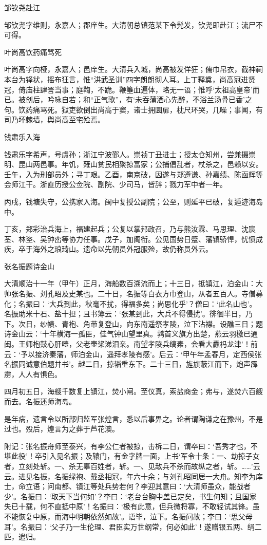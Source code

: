 \documentclass[]{article}
\begin{document}
邹钦尧赴江

邹钦尧字维则，永嘉人；郡庠生。大清朝总镇范某下令髡发，钦尧即赴江；流尸不可得。

叶尚高饮药痛骂死

叶尚高字向桠，永嘉人；邑庠生。大清兵入城，尚高被发佯狂；儒巾帛衣，截神祠本台为铎状，摇布狂言，惟``洪武圣训''四字朗朗彻人耳。上丁释奠，尚高冠进贤冠，倚庙柱肆詈当事；庭鞫，不跪。鞭箠血遍体，略无一语；惟呼`太祖高皇帝'而已。被创后，吟咏自若；和``正气歌''，有`未吞蒲酒心先醉，不浴兰汤骨已香'之句。饮药痛骂死。狱吏欲倒出尚高于窦，诸士拥圜扉，枕尺环哭，几噪；事闻，有司乃坏棘墙，舆尚高至宅殓焉。

钱肃乐入海

钱肃乐字希声，号虞孙；浙江宁波鄞人。崇祯丁丑进士；授太仓知州，尝兼摄崇明、昆山两邑事。年饥，薙山贫民相聚掠富家；公捕倡乱者，杖杀之，邑赖以安。壬午，入为刑部员外；寻丁艰。乙酉，南京破，因遂与郑遵谦、孙嘉绩、陈函辉等会师江干。浙直历授公佥院、副院、少司马，皆辞；戮力军中者一年。

丙戌，钱塘失守，公携家入海。闽中复授公副院；公至，则延平已破，复遁迹海岛中。

丁亥，郑彩治兵海上，福建起兵；公复以掌邦政召，乃与熊汝霖、马思理、沈宸荃、林垐、吴钟峦等协力任事。戊子，加阁衔。公见国势日蹙、藩镇骄悍，忧愤成疾，卒于海外之琅琦山。遗命以先朝员外冠服殓，故仍称员外云。

张名振题诗金山

大清顺治十一年（甲午）正月，海船数百溯流而上；十三日，抵镇江，泊金山：大帅张名振、刘孔昭及史某也。二十日，名振等白衣方巾登山，从者五百人。寺僧募化；名振曰：`大兵到此，秋毫不扰，得福多矣；尚思化乎'？僧曰：`此名山也'。名振助米十石、盐十担；且书簿云：`张某到此，大兵不得侵扰'。徘徊半日，乃下。次日，纱帻、青袍、角带复登山，向东南遥祭孝陵，泣下沾襟。设醮三日；题诗金山云：`十年横海一孤臣，佳气钟山望里真。鹑首义旗方出楚，燕云羽檄已通闽。王师枹鼓心肝噎，父老壶桨涕泪亲。南望孝陵兵缟素，会看大纛祃龙津'！前云：`予以接济秦藩，师泊金山，遥拜孝陵有感'。后云：`甲午年孟春月，定西侯张名振同诚意伯题并书'。越二日，掠辎重东下。二十三日，旌旗蔽江而下，炮声霹雳，人人有惧色。

四月初五日，海艘千数复上镇江，焚小闸。至仪真，索盐商金；弗与，遂焚六百艘而去。名振还师海岛。

是年病，遗言令以所部归监军张煌言，悉以后事畀之。论者谓陶谦之在豫州，不是过也。殁后，煌言为之葬于芦花澳。

附记：张名振舟师至泰兴，有李公仁者被掠，击柝二日，谓卒曰：`吾秀才也，不堪此役'！卒引入见名振；及辕门，有金字牌一面，上书`军令十条：一、劫掠子女者，立刻处斩。一、杀无辜百姓者，斩。一、见敌兵不杀而故纵之者，斩。\ldots{}\ldots{}'云云。进见名振，名振绿袍、戴丞相冠，年六十余；与刘孔昭同居一大舟。知李为庠士，命立语；问南都、镇江等处兵势若何？李迎其意曰：`大清师虽众，能战者少'。名振曰：`取天下当何如'？李曰：`老台台胸中盖已定矣，书生何知；且国家失已十载，何不直抵中原'！名振曰：`极有此意，但兵微将寡，不敢轻试其锋。虽不能恢复中原，而海中明朝依然如故'。语毕，泣下。名振问故；李曰：`思父母耳'。名振曰：`父子乃一生伦理、君臣实万世纲常，何必如此'！遂赠银五两、绢二匹，遣归。
\end{document}
